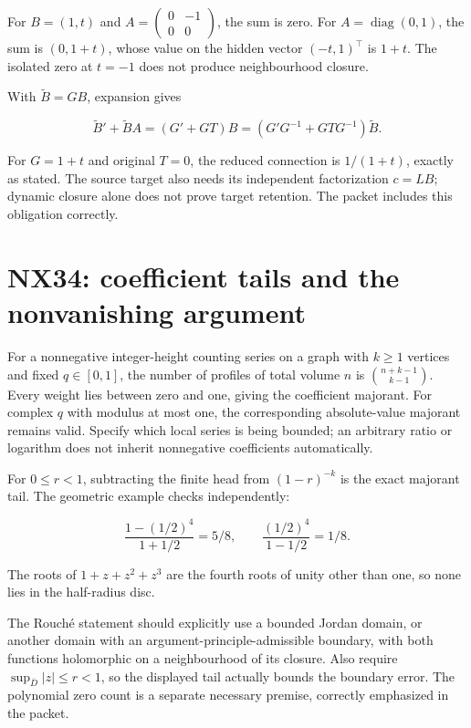 \documentclass[
  11pt,
  a4paper,
]{report}
\begin{document}
For \(B=(1,t)\) and \(A=\begin{pmatrix}0&-1\\0&0\end{pmatrix}\), the sum
is zero. For \(A=\operatorname{diag}(0,1)\), the sum is \((0,1+t)\),
whose value on the hidden vector \((-t,1)^\top\) is \(1+t\). The
isolated zero at \(t=-1\) does not produce neighbourhood closure.

With \(\widetilde B=GB\), expansion gives

\[
\widetilde B'+\widetilde BA
=(G'+GT)B
=(G'G^{-1}+GTG^{-1})\widetilde B.
\]

For \(G=1+t\) and original \(T=0\), the reduced connection is
\(1/(1+t)\), exactly as stated. The source target also needs its
independent factorization \(c=LB\); dynamic closure alone does not prove
target retention. The packet includes this obligation correctly.

\hypertarget{nx34-coefficient-tails-and-the-nonvanishing-argument}{%
\section{NX34: coefficient tails and the nonvanishing
argument}\label{nx34-coefficient-tails-and-the-nonvanishing-argument}}

For a nonnegative integer-height counting series on a graph with
\(k\ge1\) vertices and fixed \(q\in[0,1]\), the number of profiles of
total volume \(n\) is \(\binom{n+k-1}{k-1}\). Every weight lies between
zero and one, giving the coefficient majorant. For complex \(q\) with
modulus at most one, the corresponding absolute-value majorant remains
valid. Specify which local series is being bounded; an arbitrary ratio
or logarithm does not inherit nonnegative coefficients automatically.

For \(0\le r<1\), subtracting the finite head from \((1-r)^{-k}\) is the
exact majorant tail. The geometric example checks independently:

\[
\frac{1-(1/2)^4}{1+1/2}=5/8,
\qquad
\frac{(1/2)^4}{1-1/2}=1/8.
\]

The roots of \(1+z+z^2+z^3\) are the fourth roots of unity other than
one, so none lies in the half-radius disc.

The Rouché statement should explicitly use a bounded Jordan domain, or
another domain with an argument-principle-admissible boundary, with both
functions holomorphic on a neighbourhood of its closure. Also require
\(\sup_{\overline D}|z|\le r<1\), so the displayed tail actually bounds
the boundary error. The polynomial zero count is a separate necessary
premise, correctly emphasized in the packet.
\end{document}
